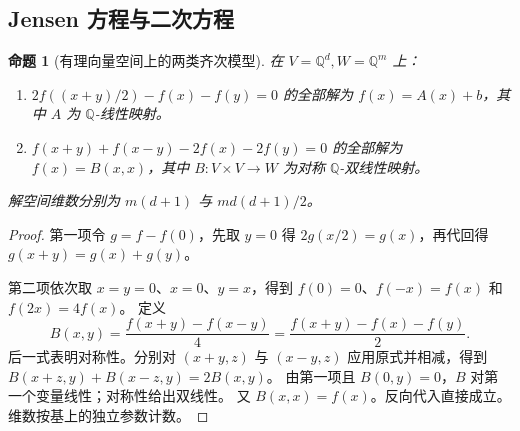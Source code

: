 \documentclass[11pt,a4paper,oneside,openany]{book}
\theoremstyle{lecture}
\newtheorem{proposition}[theorem]{命题}
\newcommand{\Q}{\mathbb Q}
\numberwithin{equation}{section}
\begin{document}
\subsection{Jensen 方程与二次方程}
\begin{proposition}[有理向量空间上的两类齐次模型]
在 $V=\Q^d,W=\Q^m$ 上：
\begin{enumerate}
\item $2f((x+y)/2)-f(x)-f(y)=0$ 的全部解为 $f(x)=A(x)+b$，其中 $A$ 为 $\Q$-线性映射。
\item $f(x+y)+f(x-y)-2f(x)-2f(y)=0$ 的全部解为 $f(x)=B(x,x)$，其中 $B:V\times V\to W$ 为对称 $\Q$-双线性映射。
\end{enumerate}
解空间维数分别为 $m(d+1)$ 与 $m d(d+1)/2$。
\end{proposition}
\begin{proof}
第一项令 $g=f-f(0)$，先取 $y=0$ 得 $2g(x/2)=g(x)$，再代回得 $g(x+y)=g(x)+g(y)$。

第二项依次取 $x=y=0$、$x=0$、$y=x$，得到 $f(0)=0$、$f(-x)=f(x)$ 和 $f(2x)=4f(x)$。
定义
\[
 B(x,y)=\frac{f(x+y)-f(x-y)}4
       =\frac{f(x+y)-f(x)-f(y)}2.
\]
后一式表明对称性。分别对 $(x+y,z)$ 与 $(x-y,z)$ 应用原式并相减，得到
$B(x+z,y)+B(x-z,y)=2B(x,y)$。
由第一项且 $B(0,y)=0$，$B$ 对第一个变量线性；对称性给出双线性。
又 $B(x,x)=f(x)$。反向代入直接成立。维数按基上的独立参数计数。
\end{proof}
\end{document}
